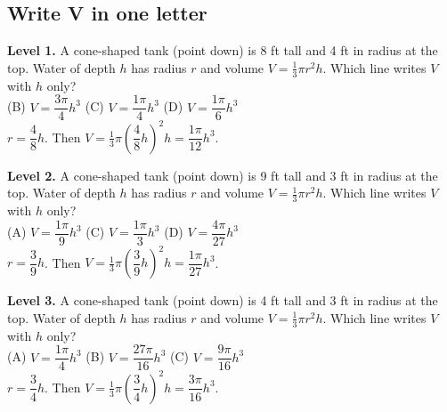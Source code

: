 \documentclass[11pt]{article}
\begin{document}
\subsection*{Write V in one letter}
\noindent\textbf{Level 1.} A cone-shaped tank (point down) is 8 ft tall and 4 ft in radius at the top. Water of depth $h$ has radius $r$ and volume $V=\tfrac13\pi r^2h$. Which line writes $V$ with $h$ only?\\  \quad (B) $V=\dfrac{3\pi}{4}h^3$ \quad (C) $V=\dfrac{1\pi}{4}h^3$ \quad (D) $V=\dfrac{1\pi}{6}h^3$\\  \quad $r=\dfrac{4}{8}h$. Then $V=\tfrac13\pi\left(\dfrac{4}{8}h\right)^2h=\dfrac{1\pi}{12}h^3$.\par\medskip
\noindent\textbf{Level 2.} A cone-shaped tank (point down) is 9 ft tall and 3 ft in radius at the top. Water of depth $h$ has radius $r$ and volume $V=\tfrac13\pi r^2h$. Which line writes $V$ with $h$ only?\\ (A) $V=\dfrac{1\pi}{9}h^3$ \quad {} \quad (C) $V=\dfrac{1\pi}{3}h^3$ \quad (D) $V=\dfrac{4\pi}{27}h^3$\\  \quad $r=\dfrac{3}{9}h$. Then $V=\tfrac13\pi\left(\dfrac{3}{9}h\right)^2h=\dfrac{1\pi}{27}h^3$.\par\medskip
\noindent\textbf{Level 3.} A cone-shaped tank (point down) is 4 ft tall and 3 ft in radius at the top. Water of depth $h$ has radius $r$ and volume $V=\tfrac13\pi r^2h$. Which line writes $V$ with $h$ only?\\ (A) $V=\dfrac{1\pi}{4}h^3$ \quad (B) $V=\dfrac{27\pi}{16}h^3$ \quad (C) $V=\dfrac{9\pi}{16}h^3$ \quad {}\\  \quad $r=\dfrac{3}{4}h$. Then $V=\tfrac13\pi\left(\dfrac{3}{4}h\right)^2h=\dfrac{3\pi}{16}h^3$.\par\medskip
\end{document}
